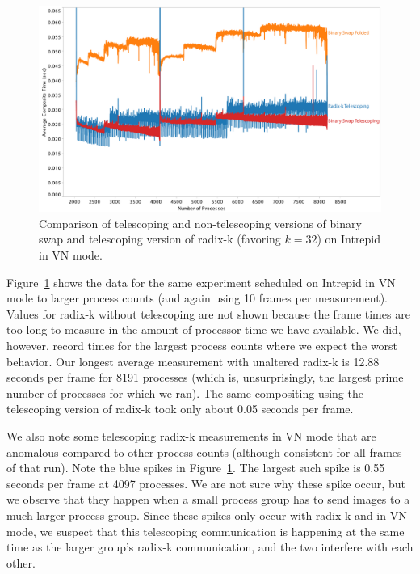 \documentclass{acm_proc_article-sp}
\begin{document}
\begin{figure}[tbp]
  \centering
  \includegraphics[width=\linewidth]{images/TelescopeCompositeIntrepidVN}
  \caption{Comparison of telescoping and non-telescoping versions of binary
    swap and telescoping version of radix-k (favoring $k=32$) on Intrepid
    in VN mode.}
  \label{fig:TelescopeCompositeIntrepidVN}
\end{figure}

Figure~\ref{fig:TelescopeCompositeIntrepidVN} shows the data for the same
experiment scheduled on Intrepid in VN mode to larger process counts (and
again using 10 frames per measurement).  Values for radix-k without
telescoping are not shown because the frame times are too long to measure
in the amount of processor time we have available.  We did, however, record
times for the largest process counts where we expect the worst behavior.
Our longest average measurement with unaltered radix-k is 12.88 seconds per
frame for 8191 processes (which is, unsurprisingly, the largest prime
number of processes for which we ran).  The same compositing using the
telescoping version of radix-k took only about 0.05 seconds per frame.

We also note some telescoping radix-k measurements in VN mode that are
anomalous compared to other process counts (although consistent for all
frames of that run).  Note the blue spikes in
Figure~\ref{fig:TelescopeCompositeIntrepidVN}.  The largest such spike is
0.55 seconds per frame at 4097 processes.  We are not sure why these spike
occur, but we observe that they happen when a small process group has to
send images to a much larger process group.  Since these spikes only occur
with radix-k and in VN mode, we suspect that this telescoping communication
is happening at the same time as the larger group's radix-k communication,
and the two interfere with each other.
\end{document}
